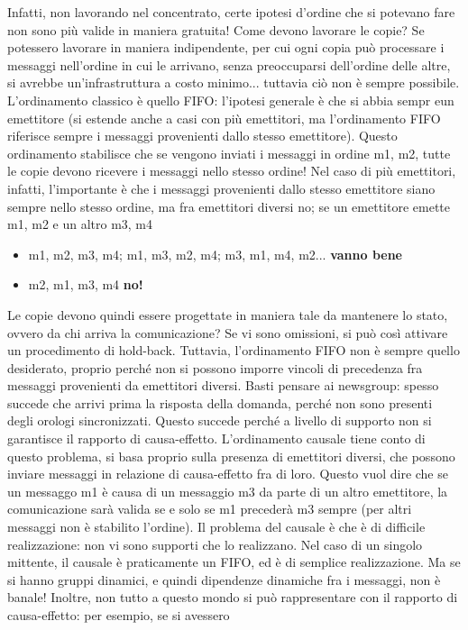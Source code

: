 Infatti, non lavorando nel concentrato, certe ipotesi d'ordine che si potevano fare non sono più valide in maniera
gratuita! Come devono lavorare le copie?
Se potessero lavorare in maniera indipendente, per cui ogni copia può processare i messaggi nell'ordine in cui le
arrivano, senza preoccuparsi dell'ordine delle altre, si avrebbe un'infrastruttura a costo minimo... tuttavia ciò non
è sempre possibile.
L'ordinamento classico è quello FIFO: l'ipotesi generale è che si abbia sempr eun emettitore (si estende anche a casi
con più emettitori, ma l'ordinamento FIFO riferisce sempre i messaggi provenienti dallo stesso emettitore). Questo
ordinamento stabilisce che se vengono inviati i messaggi in ordine m1, m2, tutte le copie devono ricevere i messaggi
nello stesso ordine! Nel caso di più emettitori, infatti, l'importante è che i messaggi provenienti dallo stesso
emettitore siano sempre nello stesso ordine, ma fra emettitori diversi no; se un emettitore emette m1, m2 e un altro 
m3, m4
\begin{itemize}
 \item m1, m2, m3, m4; m1, m3, m2, m4; m3, m1, m4, m2... \textbf{vanno bene}
 \item m2, m1, m3, m4 \textbf{no!}
\end{itemize}
Le copie devono quindi essere progettate in maniera tale da mantenere lo stato, ovvero da chi arriva la comunicazione?
Se vi sono omissioni, si può così attivare un procedimento di hold-back.
Tuttavia, l'ordinamento FIFO non è sempre quello desiderato, proprio perché non si possono imporre vincoli di 
precedenza fra messaggi provenienti da emettitori diversi. Basti pensare ai newsgroup: spesso succede che arrivi 
prima la risposta della domanda, perché non sono presenti degli orologi sincronizzati. Questo succede perché a livello
di supporto non si garantisce il rapporto di causa-effetto.
L'ordinamento causale tiene conto di questo problema, si basa proprio sulla presenza di emettitori diversi, che 
possono inviare messaggi in relazione di causa-effetto fra di loro. Questo vuol dire che se un messaggo m1 è causa di
un messaggio m3 da parte di un altro emettitore, la comunicazione sarà valida se e solo se m1 precederà m3 sempre (per
altri messaggi non è stabilito l'ordine).
Il problema del causale è che è di difficile realizzazione: non vi sono supporti che lo realizzano. Nel caso di un
singolo mittente, il causale è praticamente un FIFO, ed è di semplice realizzazione. Ma se si hanno gruppi dinamici, 
e quindi dipendenze dinamiche fra i messaggi, non è banale!
Inoltre, non tutto a questo mondo si può rappresentare con il rapporto di causa-effetto: per esempio, se si avessero
